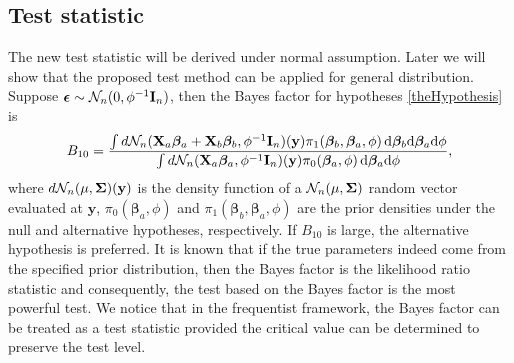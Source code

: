 \documentclass[smallextended]{svjour3}       %
\newcommand{\By}{\mathbf{y}}    \newcommand{\Bz}{\mathbf{z}}
\newcommand{\bfsym}[1]{\ensuremath{\boldsymbol{#1}}}
\def\bbeta{\bfsym \beta}
\begin{document}
\subsection{Test statistic}
The new test statistic will be derived under normal assumption.
Later we will show that the proposed test method can be applied for general distribution.
Suppose $\bepsilon \sim \mathcal N_n (0,\phi^{-1} \BI_n)$, then the Bayes factor for hypotheses \eqref{theHypothesis} is
\begin{equation*}
    B_{10}= \frac {
        \int d\mathcal N_n(\BX_a\bbeta_a + \BX_b\bbeta_b, \phi^{-1}\BI_n) (\By) \pi_1(\bbeta_b,\bbeta_a,\phi)\, \mathrm d\bbeta_b \mathrm d\bbeta_a \mathrm d\phi
}{
    \int d\mathcal N_n(\BX_a\bbeta_a, \phi^{-1} \BI_n)(\By) \pi_0(\bbeta_a,\phi) \, \mathrm d\bbeta_a \mathrm d\phi
    },
\end{equation*}
where $d\mathcal N_n(\mu, \bSigma)(\By)$ is the density function of a $\mathcal N_n(\mu,\bSigma) $ random vector evaluated at $\By$,  $\pi_0(\bbeta_a,\phi)$ and $\pi_1(\bbeta_b,\bbeta_a,\phi)$ are the prior densities under the null and alternative hypotheses, respectively.
If $B_{10}$ is large, the alternative hypothesis is preferred.
It is known that if the true parameters indeed come from the specified prior distribution, then the Bayes factor is the likelihood ratio statistic and consequently, the test based on the Bayes factor is the most powerful test.
We notice that in the frequentist framework, the Bayes factor can be treated as a test statistic provided the critical value can be determined to preserve the test level.
\end{document}
